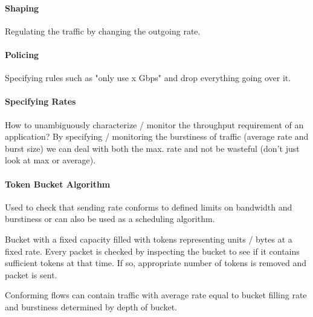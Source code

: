 \paragraph{Shaping}
Regulating the traffic by changing the outgoing rate.

\paragraph{Policing}
Specifying rules such as "only use x Gbps" and drop everything going over it.

\paragraph{Specifying Rates}
How to unambiguously characterize / monitor the throughput requirement of an application? By specifying / monitoring the burstiness of traffic (average rate and burst size) we can deal with both the max. rate and not be wasteful (don't just look at max or average).

\paragraph{Token Bucket Algorithm}
Used to check that sending rate conforms to defined limits on bandwidth and burstiness or can also be used as a scheduling algorithm.

Bucket with a fixed capacity filled with tokens representing units / bytes at a fixed rate. Every packet is checked by inspecting the bucket to see if it contains sufficient tokens at that time. If so, appropriate number of tokens is removed and packet is sent.

Conforming flows can contain traffic with average rate equal to bucket filling rate and burstiness determined by depth of bucket.


